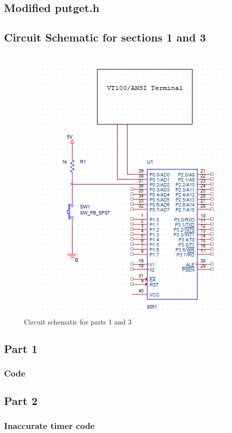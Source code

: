 \documentclass[12pt]{article}
\begin{document}
\subsection{Modified putget.h}
	
\subsection{Circuit Schematic for sections 1 and 3}
	\begin{figure}[H]
		\centering
		\includegraphics{schematic.png}
		\caption{Circuit schematic for parts 1 and 3}
		\label{schematic}
	\end{figure} 
\subsection{Part 1}
	\subsubsection{Code}
		
\subsection{Part 2}
	\subsubsection{Inaccurate timer code}
		
\end{document}
